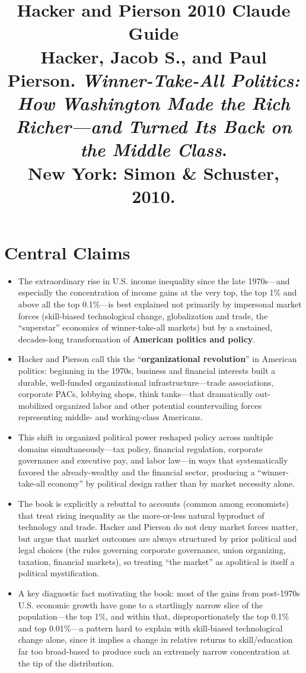 \documentclass[12pt]{article}
\title{\textbf{Hacker and Pierson 2010 Claude Guide}\\
\large Hacker, Jacob S., and Paul Pierson. \textit{Winner-Take-All Politics: How Washington Made the Rich Richer---and Turned Its Back on the Middle Class}.\\
New York: Simon \& Schuster, 2010.}
\author{}
\date{}
\begin{document}
\maketitle
\tableofcontents
\newpage

\section{Central Claims}

\begin{itemize}[leftmargin=*, itemsep=4pt]
    \item The extraordinary rise in U.S. income inequality since the late 1970s---and especially the concentration of income gains at the very top, the top 1\% and above all the top 0.1\%---is best explained not primarily by impersonal market forces (skill-biased technological change, globalization and trade, the ``superstar'' economics of winner-take-all markets) but by a sustained, decades-long transformation of \textbf{American politics and policy}.
    \item Hacker and Pierson call this the ``\textbf{organizational revolution}'' in American politics: beginning in the 1970s, business and financial interests built a durable, well-funded organizational infrastructure---trade associations, corporate PACs, lobbying shops, think tanks---that dramatically out-mobilized organized labor and other potential countervailing forces representing middle- and working-class Americans.
    \item This shift in organized political power reshaped policy across multiple domains simultaneously---tax policy, financial regulation, corporate governance and executive pay, and labor law---in ways that systematically favored the already-wealthy and the financial sector, producing a ``winner-take-all economy'' by political design rather than by market necessity alone.
    \item The book is explicitly a rebuttal to accounts (common among economists) that treat rising inequality as the more-or-less natural byproduct of technology and trade. Hacker and Pierson do not deny market forces matter, but argue that market outcomes are always structured by prior political and legal choices (the rules governing corporate governance, union organizing, taxation, financial markets), so treating ``the market'' as apolitical is itself a political mystification.
    \item A key diagnostic fact motivating the book: most of the gains from post-1970s U.S. economic growth have gone to a startlingly narrow slice of the population---the top 1\%, and within that, disproportionately the top 0.1\% and top 0.01\%---a pattern hard to explain with skill-biased technological change alone, since it implies a change in relative returns to skill/education far too broad-based to produce such an extremely narrow concentration at the tip of the distribution.

\end{itemize}
\end{document}

